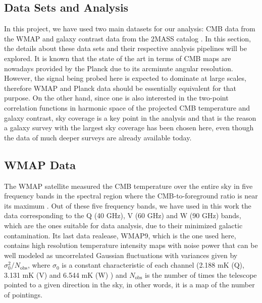 \documentclass[openany,a4paper,12pt,oneside]{book}
\begin{document}
\begin{spacing}{1.5}



\section{Data Sets and Analysis}

In this project, we have used two main datasets for our analysis: CMB data from the WMAP \cite{WMAP_results,WMAP_data} and galaxy contrast data from the 2MASS catalog \cite{2MASS}. In this section, the details about these data sets and their respective analysis pipelines will be explored. It is known that the state of the art in terms of CMB maps are nowadays provided by the Planck due to its arcminute angular resolution. However, the signal being probed here is expected to dominate at large scales, therefore WMAP and Planck data should be essentially equivalent for that purpose. On the other hand, since one is also interested in the two-point correlation functions in harmonic space of the projected CMB temperature and galaxy contrast, sky coverage is a key point in the analysis and that is the reason a galaxy survey with the largest sky coverage has been chosen here, even though the data of much deeper surveys are already available today.

\subsection{WMAP Data}

The WMAP satellite measured the CMB temperature over the entire sky in five frequency bands in the spectral region where the
CMB-to-foreground ratio is near its maximum \cite{WMAP_data}. Out of these five frequency bands, we have used in this work the data corresponding to the Q (40 GHz), V (60 GHz) and W (90 GHz) bands, which are the ones suitable for data analysis, due to their minimized galactic contamination. Its last data realease, WMAP9, which is the one used here, contains high resolution temperature intensity maps with noise power that can be well modeled as uncorrelated Gaussian fluctuations with variances given by $\sigma_0^2/N_\text{obs}$, where $\sigma_0$ is a constant characteristic of each channel (2.188 mK (Q), 3.131 mK (V) and 6.544 mK (W) \cite{wmap_supplement}) and $N_{\textrm{obs}}$ is the number of times the telescope pointed to a given direction in the sky, in other words, it is a map of the number of pointings.


\end{spacing}
\end{document}

